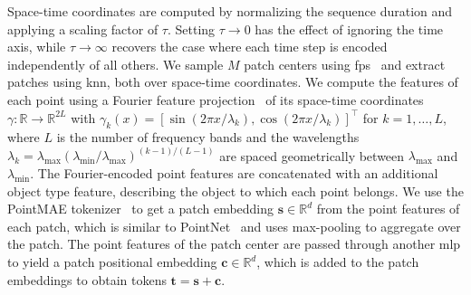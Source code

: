 Space-time coordinates are computed by normalizing the sequence duration and applying a scaling factor of $\tau$.
Setting $\tau {\rightarrow} 0$ has the effect of ignoring the time axis, while $\tau {\rightarrow} \infty$ recovers the case where each time step is encoded independently of all others.
We sample $M$ patch centers using \gls{fps}~\citep{ruizhongtai2017pointnet} and extract patches using \gls{knn}, both over space-time coordinates.
We compute the features of each point using a Fourier feature projection~\citep{tancik2020fourier, gyenes2026fourier} of its space-time coordinates \mbox{$\gamma:\mathbb{R}\to\mathbb{R}^{2L}$} with $\gamma_k(x) = [\sin(2\pi x / \lambda_k), \cos(2\pi x / \lambda_k)]^\top$ for $k = 1, \dots, L$, where $L$ is the number of frequency bands and the wavelengths $\lambda_k = \lambda_\text{max} (\lambda_\text{min} / \lambda_\text{max})^{(k-1)/(L-1)}$ are spaced geometrically between $\lambda_\text{max}$ and $\lambda_\text{min}$.
The Fourier-encoded point features are concatenated with an additional object type feature, describing the object to which each point belongs.
We use the PointMAE tokenizer~\citep{pointMAE} to get a patch embedding $\mathbf{s} \in \mathbb{R}^{d}$ from the point features of each patch, which is similar to PointNet~\citep{ruizhongtai2017pointnet} and uses max-pooling to aggregate over the patch.
The point features of the patch center are passed through another \gls{mlp} to yield a patch positional embedding $\mathbf{c} \in \mathbb{R}^{d}$, which is added to the patch embeddings to obtain tokens $\mathbf{t} = \mathbf{s} + \mathbf{c}$.

